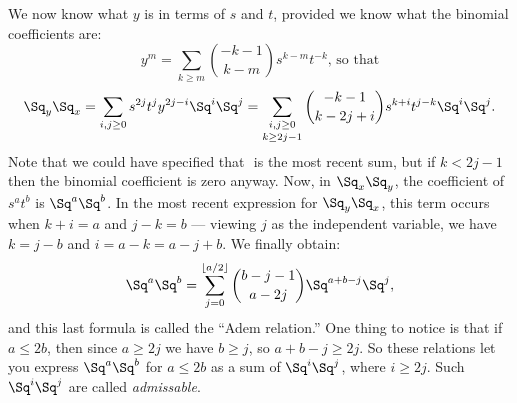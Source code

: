 We now know what $y$ is in terms of $s$ and $t$, provided we know what the binomial coefficients are:
\[
y^m = \sum_{k \ge m} \binom{-k-1}{k-m} s^{k-m} t^{-k}\text{, \ so that}
\]
\[
\Sq_y \Sq_x = \sum_{i, j \ge 0} s^{2j} t^j y^{2j-i} \Sq^i \Sq^j = \mathop{\sum_{i, j \ge 0}}_{k\geq2j-1} \binom{-k-1}{k-2j+i} s^{k+i}t^{j-k}\Sq^i\Sq^j
.\]
Note that we could have specified that $ $ is the most recent sum, but if $k<2j-1$ then the binomial coefficient is zero anyway.
Now, in $\Sq_x \Sq_y$, the coefficient of $s^a t^b$ is $\Sq^a \Sq^b$.  In the most recent expression for $\Sq_y \Sq_x$, this term occurs when $k + i = a$ and $j - k = b$ --- viewing $j$ as the independent variable, we have $k = j - b$ and $i = a - k = a - j + b$.  We finally obtain:
\[
\Sq^a \Sq^b = \sum_{j=0}^{\lfloor a/2\rfloor} \binom{b-j-1}{a-2j} \Sq^{a+b-j} \Sq^j
,\]
and this last formula is called the ``Adem relation.''  One thing to notice is that if $a \le 2b$, then since $a \ge 2j$ we have $b \ge j$, so $a + b -j \ge 2j$.  So these relations let you express $\Sq^a \Sq^b$ for $a \le 2b$ as a sum of $\Sq^i \Sq^j$, where $i \ge 2j$.  Such $\Sq^i \Sq^j$ are called \emph{admissable}.

